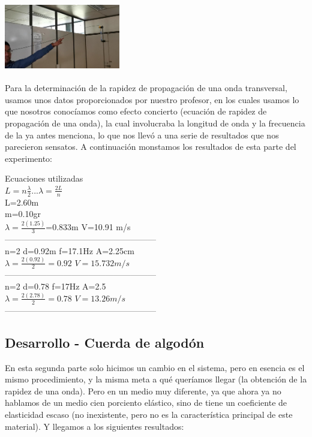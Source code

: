 \documentclass[10pt]{article}
\begin{document}
\begin{multicols}{2}
\begin{center}
	\includegraphics[width=5.05cm,height=3.06cm]{Imagenes/4.png}
	\label{fig:1}
\end{center}
Para la determinación de la rapidez de propagación de una onda transversal, usamos unos datos proporcionados por nuestro profesor, en los cuales usamos lo que nosotros conocíamos como efecto concierto (ecuación de rapidez de propagación de una onda), la cual involucraba la longitud de onda y la frecuencia de la ya antes menciona, lo que nos llevó a una serie de resultados que nos parecieron sensatos.
A continuación monstamos los resultados de esta parte del experimento:

Ecuaciones utilizadas\\
$L=n\frac{\lambda}{2}$...$\lambda=\frac{2L}{n}$\\
L=2.60m\\
m=0.10gr\\
$\lambda=\frac{2(1.25)}{3}$=0.833m V=10.91 m/s \\
------------------------------------------------------\\

n=2 d=0.92m f=17.1Hz A=2.25cm\\
$\lambda=\frac{2(0.92)}{2}=0.92$ $ V=15.732m/s$\\
------------------------------------------------------\\
n=2 d=0.78 f=17Hz A=2.5\\
$\lambda=\frac{2(2.78)}{2}=0.78$ $V=13.26m/s$\\
------------------------------------------------------\\
\subsection{Desarrollo - Cuerda de algodón}
En esta segunda parte solo hicimos un cambio en el sistema, pero en esencia es el mismo procedimiento, y la misma meta a qué queríamos llegar (la obtención de la rapidez de una onda).
Pero en un medio muy diferente, ya que ahora ya no hablamos de un medio cien porciento elástico, sino de tiene un coeficiente de elasticidad escaso (no inexistente, pero no es la característica principal de este material). Y llegamos a los siguientes resultados:


\end{multicols}
\end{document}
